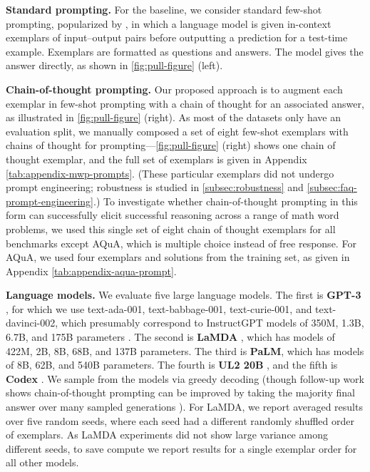 \documentclass[]{article}
\theoremstyle{plain}
\theoremstyle{definition}
\theoremstyle{remark}
\newcommand{\lamda}[0]{LaMDA}
\newcommand{\palm}[0]{PaLM}
\begin{document}
\textbf{Standard prompting.}
For the baseline, we consider standard few-shot prompting, popularized by \citet{brown2020language}, in which a language model is given in-context exemplars of input--output pairs before outputting a prediction for a test-time example. 
Exemplars are formatted as questions and answers. 
The model gives the answer directly, as shown in \cref{fig:pull-figure} (left).

\textbf{Chain-of-thought prompting.}
Our proposed approach is to augment each exemplar in few-shot prompting with a chain of thought for an associated answer, as illustrated in \cref{fig:pull-figure} (right). 
As most of the datasets only have an evaluation split, we manually composed a set of eight few-shot exemplars with chains of thought for prompting---\cref{fig:pull-figure} (right) shows one chain of thought exemplar, and the full set of exemplars is given in Appendix \cref{tab:appendix-mwp-prompts}. 
(These particular exemplars did not undergo prompt engineering; robustness is studied in \cref{subsec:robustness} and \cref{subsec:faq-prompt-engineering}.)
To investigate whether chain-of-thought prompting in this form can successfully elicit successful reasoning across a range of math word problems, we used this single set of eight chain of thought exemplars for all benchmarks except AQuA, which is multiple choice instead of free response.
For AQuA, we used four exemplars and solutions from the training set, as given in Appendix \cref{tab:appendix-aqua-prompt}.

\textbf{Language models.}
We evaluate five large language models.
The first is \textbf{GPT-3} \citep{brown2020language}, for which we use text-ada-001, text-babbage-001, text-curie-001, and text-davinci-002, which presumably correspond to InstructGPT models of 350M, 1.3B, 6.7B, and 175B parameters \citep{ouyang2022training}.%
The second is \textbf{\lamda{}} \citep{thoppilan2022lamda}, which has models of 422M, 2B, 8B, 68B, and 137B parameters. %
The third is \textbf{\palm{}}, which has models of 8B, 62B, and 540B parameters.
The fourth is \textbf{UL2 20B} \citep{tay2022unifying}, and the fifth is \textbf{Codex} \citep[][code-davinci-002 in the OpenAI API]{chen2021evaluating}.
We sample from the models via greedy decoding (though follow-up work shows chain-of-thought prompting can be improved by taking the majority final answer over many sampled generations \citep{wang2022self}).
For \lamda{}, we report averaged results over five random seeds, where each seed had a different randomly shuffled order of exemplars.
As \lamda{} experiments did not show large variance among different seeds, to save compute we report results for a single exemplar order for all other models.
\end{document}
